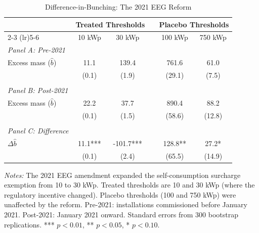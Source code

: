 \begin{table}[t]
\centering
\caption{Difference-in-Bunching: The 2021 EEG Reform}
\label{tab:dib}
\begin{threeparttable}
\begin{tabular}{lccccc}
\toprule
 & \multicolumn{2}{c}{Treated Thresholds} & & \multicolumn{2}{c}{Placebo Thresholds} \\
\cmidrule(lr){2-3} \cmidrule(lr){5-6}
 & 10 kWp & 30 kWp & & 100 kWp & 750 kWp \\
\midrule
\textit{Panel A: Pre-2021} & & & & & \\
\quad Excess mass ($\hat{b}$) & 11.1 & 139.4 & & 761.6 & 61.0 \\
\quad & (0.1) & (1.9) & & (29.1) & (7.5) \\
 & & & & & \\
\textit{Panel B: Post-2021} & & & & & \\
\quad Excess mass ($\hat{b}$) & 22.2 & 37.7 & & 890.4 & 88.2 \\
\quad & (0.1) & (1.5) & & (58.6) & (12.8) \\
 & & & & & \\
\midrule
\textit{Panel C: Difference} & & & & & \\
\quad $\Delta\hat{b}$ & 11.1*** & -101.7*** & & 128.8** & 27.2* \\
\quad & (0.1) & (2.4) & & (65.5) & (14.9) \\
\bottomrule
\end{tabular}
\begin{tablenotes}[flushleft]\footnotesize
\item \textit{Notes:} The 2021 EEG amendment expanded the self-consumption surcharge exemption from 10 to 30 kWp. Treated thresholds are 10 and 30 kWp (where the regulatory incentive changed). Placebo thresholds (100 and 750 kWp) were unaffected by the reform. Pre-2021: installations commissioned before January 2021. Post-2021: January 2021 onward. Standard errors from 300 bootstrap replications. *** $p<0.01$, ** $p<0.05$, * $p<0.10$.
\end{tablenotes}
\end{threeparttable}
\end{table}
